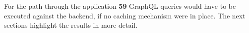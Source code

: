 \documentclass[MSE,Master,english]{twbook}%
\begin{document}
For the path through the application \textbf{59} GraphQL queries would have to be executed against the backend, if no caching mechanism were in place. The next sections highlight the results in more detail.

\ifshowUnusedContent

\end{document}
